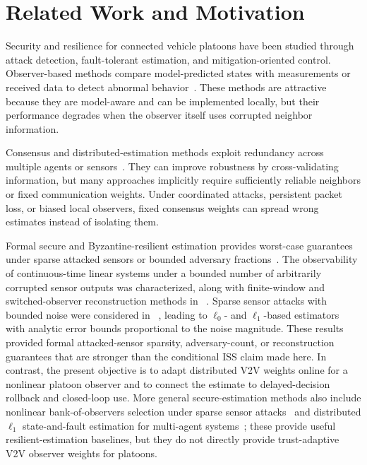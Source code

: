 \documentclass[letterpaper,journal]{IEEEtran}
\begin{document}
\section{Related Work and Motivation}\label{sec_related_work}
Security and resilience for connected vehicle platoons have been studied through attack detection, fault-tolerant estimation, and mitigation-oriented control. Observer-based methods compare model-predicted states with measurements or received data to detect abnormal behavior~\cite{jeon2020simultaneous,yamamoto2021attack,huang2022detection,2_obs_Angelo}. These methods are attractive because they are model-aware and can be implemented locally, but their performance degrades when the observer itself uses corrupted neighbor information.

Consensus and distributed-estimation methods exploit redundancy across multiple agents or sensors~\cite{Guitao_multi_mesure,Consensus_discret_Saber,Plug_play}. They can improve robustness by cross-validating information, but many approaches implicitly require sufficiently reliable neighbors or fixed communication weights. Under coordinated attacks, persistent packet loss, or biased local observers, fixed consensus weights can spread wrong estimates instead of isolating them.

Formal secure and Byzantine-resilient estimation provides worst-case guarantees under sparse attacked sensors or bounded adversary fractions~\cite{fawzi2014secure,mitra2018byzantine,khazraei2020attack_auth}. The observability of continuous-time linear systems under a bounded number of arbitrarily corrupted sensor outputs was characterized, along with finite-window and switched-observer reconstruction methods in ~\cite{chong2015observability}. Sparse sensor attacks with bounded noise were considered in ~\cite{pajic2017attack_resilient}, leading to $\ell_0$- and $\ell_1$-based estimators with analytic error bounds proportional to the noise magnitude. These results provided formal attacked-sensor sparsity, adversary-count, or reconstruction guarantees that are stronger than the conditional ISS claim made here. In contrast, the present objective is to adapt distributed V2V weights online for a nonlinear platoon observer and to connect the estimate to delayed-decision rollback and closed-loop use. More general secure-estimation methods also include nonlinear bank-of-observers selection under sparse sensor attacks~\cite{chong2021secure} and distributed $\ell_1$ state-and-fault estimation for multi-agent systems~\cite{hashimoto2020distributed_l1}; these provide useful resilient-estimation baselines, but they do not directly provide trust-adaptive V2V observer weights for platoons.
\end{document}
